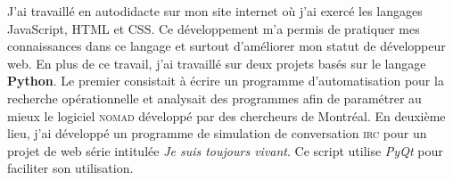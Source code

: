 J'ai travaillé en autodidacte sur mon site internet où j'ai exercé les langages JavaScript, HTML et CSS. Ce développement m'a permis de pratiquer mes connaissances dans ce langage et surtout d'améliorer mon statut de développeur web. En plus de ce travail, j'ai travaillé sur deux projets basés sur le langage \textbf{Python}. Le premier consistait à écrire un programme d'automatisation pour la recherche opérationnelle et analysait des programmes afin de paramétrer au mieux le logiciel \textsc{nomad} développé par des chercheurs de Montréal. En deuxième lieu, j'ai développé un programme de simulation de conversation \textsc{irc} pour un projet de web série intitulée \textit{Je suis toujours vivant}. Ce script utilise \textit{PyQt} pour faciliter son utilisation. \conclusion{}

\makeletterclosing
